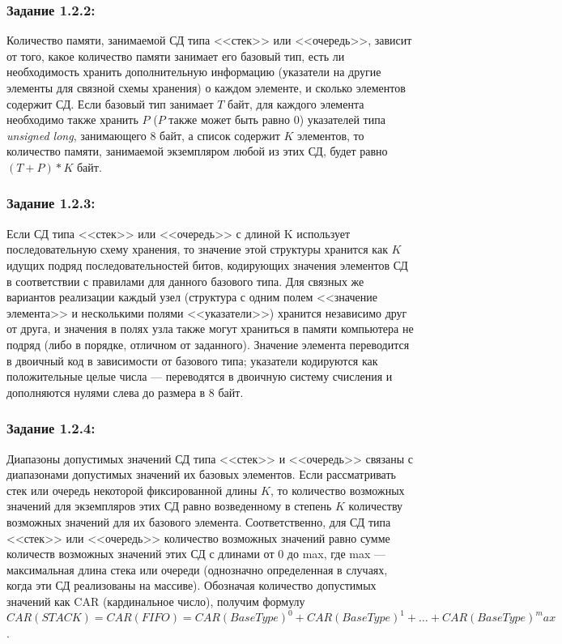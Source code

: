\documentclass[12pt]{article}
\begin{document}
{	\subsubsection{Задание 1.2.2:}
	\label{task_1_2_2}
	Количество памяти, занимаемой СД типа <<стек>> или <<очередь>>, зависит от того, какое количество памяти занимает его базовый тип, есть ли необходимость хранить дополнительную информацию (указатели на другие элементы для связной схемы хранения) о каждом элементе, и сколько элементов содержит СД. Если базовый тип занимает $T$ байт, для каждого элемента необходимо также хранить $P$ ($P$ также может быть равно 0) указателей типа {\it unsigned long}, занимающего 8 байт, а список содержит $K$ элементов, то количество памяти, занимаемой экземпляром любой из этих СД, будет равно $(T+P)*K$ байт.
	
	\subsubsection{Задание 1.2.3:}
	\label{task_1_2_3}
	Если СД типа <<стек>> или <<очередь>> с длиной K использует последовательную схему хранения, то значение этой структуры хранится как $K$ идущих подряд последовательностей битов, кодирующих значения элементов СД в соответствии с правилами для данного базового типа. Для связных же вариантов реализации каждый узел (структура с одним полем <<значение элемента>> и несколькими полями <<указатели>>) хранится независимо друг от друга, и значения в полях узла также могут храниться в памяти компьютера не подряд (либо в порядке, отличном от заданного). Значение элемента переводится в двоичный код в зависимости от базового типа; указатели кодируются как положительные целые числа --- переводятся в двоичную систему счисления и дополняются нулями слева до размера в 8 байт.

	\subsubsection{Задание 1.2.4:}
	\label{task_1_2_4}
	Диапазоны допустимых значений СД типа <<стек>> и <<очередь>> связаны с диапазонами допустимых значений их базовых элементов. Если рассматривать стек или очередь некоторой фиксированной длины $K$, то количество возможных значений для экземпляров этих СД равно возведенному в степень $K$ количеству возможных значений для их базового элемента. Соответственно, для СД типа <<стек>> или <<очередь>> количество возможных значений равно сумме количеств возможных значений этих СД с длинами от 0 до max, где max --- максимальная длина стека или очереди (однозначно определенная в случаях, когда эти СД реализованы на массиве). Обозначая количество допустимых значений как CAR (кардинальное число), получим формулу $CAR(STACK) = CAR(FIFO) = CAR(BaseType)^0 + CAR(BaseType)^1 +… + CAR(BaseType)^max$.
	
}
\end{document}
